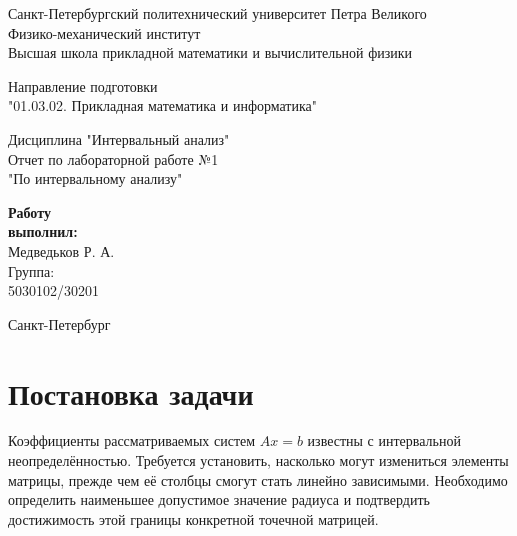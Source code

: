 \documentclass[12pt,a4paper]{article}
\begin{document}
\begin{titlepage}
\setlength{\baselineskip}{15pt}
\begin{center}
Санкт-Петербургский политехнический университет Петра Великого\\
Физико-механический институт\\
Высшая школа прикладной математики и вычислительной физики

\vspace{30mm}

Направление подготовки\\
"01.03.02. Прикладная математика и информатика"

\vspace{30mm}

{\fontsize{20}{24}\selectfont Дисциплина "Интервальный анализ"}\\[5mm]
Отчет по лабораторной работе №1\\[2mm]
"По интервальному анализу"
\end{center}

\vspace{43mm}

\begin{flushright}
\begin{minipage}{38mm}
\raggedright
\textbf{Работу\\выполнил:}\\
Медведьков Р. А.\\
Группа:\\
5030102/30201
\end{minipage}
\end{flushright}

\vfill

\begin{center}
Санкт-Петербург
\end{center}
\end{titlepage}

\section{Постановка задачи}

Коэффициенты рассматриваемых систем $Ax=b$ известны с интервальной
неопределённостью. Требуется установить, насколько могут измениться
элементы матрицы, прежде чем её столбцы смогут стать линейно зависимыми.
Необходимо определить наименьшее допустимое значение радиуса и подтвердить достижимость
этой границы конкретной точечной матрицей.
\end{document}
